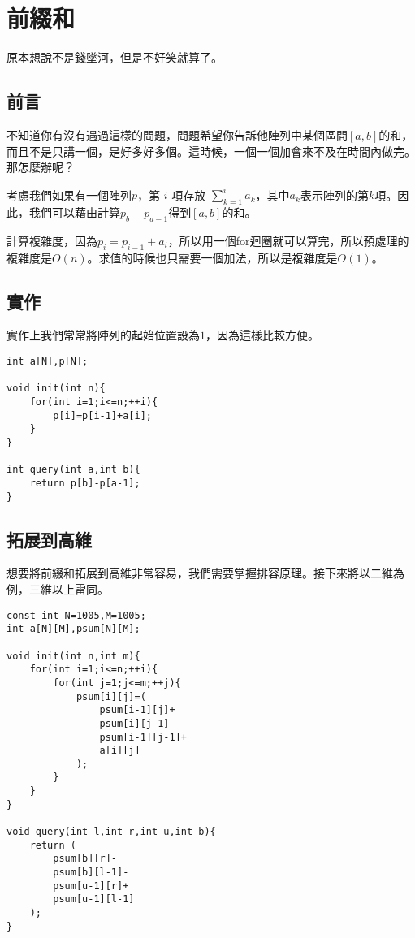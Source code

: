 \section{前綴和}
    原本想說不是錢墜河，但是不好笑就算了。

    \subsection{前言}
    不知道你有沒有遇過這樣的問題，問題希望你告訴他陣列中某個區間$[a,b]$的和，而且不是只講一個，是好多好多個。這時候，一個一個加會來不及在時間內做完。那怎麼辦呢？

    考慮我們如果有一個陣列$p$，第 $i$ 項存放 $\displaystyle\sum_{k=1}^{i}a_k$，其中$a_k$表示陣列的第$k$項。因此，我們可以藉由計算$p_b-p_{a-1}$得到$[a,b]$的和。

    計算複雜度，因為$p_i=p_{i-1}+a_i$，所以用一個for迴圈就可以算完，所以預處理的複雜度是$O(n)$。求值的時候也只需要一個加法，所以是複雜度是$O(1)$。

    \subsection{實作}
    實作上我們常常將陣列的起始位置設為$1$，因為這樣比較方便。

\begin{lstlisting}[caption=前綴和實作]
int a[N],p[N];

void init(int n){
    for(int i=1;i<=n;++i){
        p[i]=p[i-1]+a[i];
    }
}

int query(int a,int b){
    return p[b]-p[a-1];
}
\end{lstlisting}

    \subsection{拓展到高維}

    想要將前綴和拓展到高維非常容易，我們需要掌握排容原理。接下來將以二維為例，三維以上雷同。

\begin{lstlisting}[caption=二維前綴和]
const int N=1005,M=1005;
int a[N][M],psum[N][M];

void init(int n,int m){
    for(int i=1;i<=n;++i){
        for(int j=1;j<=m;++j){
            psum[i][j]=(
                psum[i-1][j]+
                psum[i][j-1]-
                psum[i-1][j-1]+
                a[i][j]
            );
        }
    }
}

void query(int l,int r,int u,int b){
    return (
        psum[b][r]-
        psum[b][l-1]-
        psum[u-1][r]+
        psum[u-1][l-1]
    );
}
\end{lstlisting}

